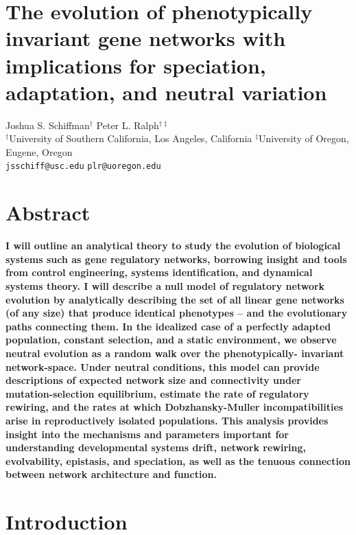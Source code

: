 \documentclass[9 pt]{article}
\newcommand{\1}{\mathbbm{1}}
\begin{document}
\section*{The evolution of phenotypically invariant gene networks with implications for speciation, adaptation, and neutral variation}
{\centering
Joshua S. Schiffman$^{\dagger}$ \qquad Peter L. Ralph$^{\dagger \ddagger}$ \\
$^{\dagger}$University of Southern California, Los Angeles, California \qquad $^{\ddagger}$University of Oregon, Eugene, Oregon \\
\texttt{jsschiff@usc.edu} \qquad \texttt{plr@uoregon.edu}
\\
}

\begin{multicols}{2}


\section*{Abstract}
  \textbf{
I will outline an analytical theory to study the evolution of biological systems such as gene regulatory networks, borrowing insight and tools from control engineering, systems identification, and dynamical systems theory. I will describe a null model of regulatory network evolution by analytically describing the set of all linear gene networks (of any size) that produce identical phenotypes -- and the evolutionary paths connecting them. In the idealized case of a perfectly adapted population, constant selection, and a static environment, we observe neutral evolution as a random walk over the phenotypically- invariant network-space. Under neutral conditions, this model can provide descriptions of expected network size and connectivity under mutation-selection equilibrium, estimate the rate of regulatory rewiring, and the rates at which Dobzhansky-Muller incompatibilities arise in reproductively isolated populations. This analysis provides insight into the mechanisms and parameters important for understanding developmental systems drift, network rewiring, evolvability, epistasis, and speciation, as well as the tenuous connection between network architecture and function. 
}
\section*{Introduction}


\end{multicols}
\end{document}
